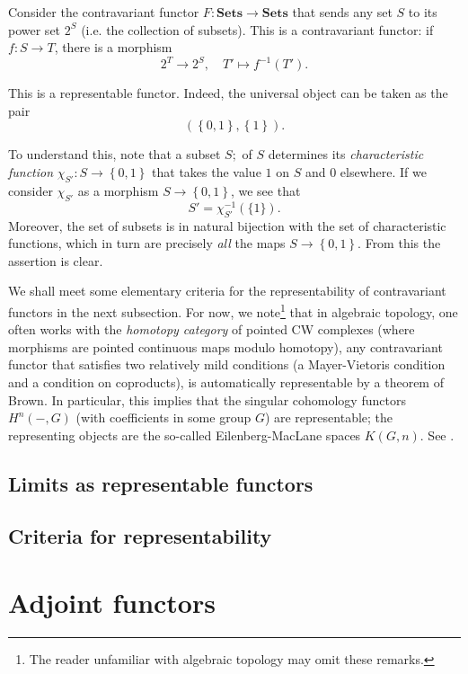 \begin{example}
Consider the contravariant functor $F: \mathbf{Sets} \to \mathbf{Sets}$ that
sends any set $S$ to its power set $2^S$ (i.e. the collection of subsets).
This is a contravariant functor: if $f: S \to T$, there is a morphism
\[ 2^T \to 2^S, \quad T' \mapsto f^{-1}(T').  \]

This is a representable functor. Indeed, the universal object can be taken as
the pair
\[ ( \left\{0,1\right\}, \left\{1\right\}).  \]

To understand this, note that a subset $S;$ of $S$ determines its
\emph{characteristic function} $\chi_{S'}: S \to \left\{0,1\right\}$ that
takes the value $1$ on $S$ and $0$ elsewhere.
If we consider $\chi_{S'}$ as a morphism $ S \to \left\{0,1\right\}$, we see
that
\[ S' = \chi_{S'}^{-1}(\{1\}).  \]
Moreover, the set of subsets is in natural bijection with the set of
characteristic functions, which in turn are precisely \emph{all} the maps $S
\to \left\{0,1\right\}$. From this the assertion is clear.
\end{example}

We shall meet some elementary criteria for the representability of
contravariant functors in the next subsection. For now, we note\footnote{The
reader unfamiliar with algebraic topology may omit these remarks.} that in
algebraic topology, one often works with the \emph{homotopy category} of
pointed CW complexes (where morphisms are pointed continuous maps modulo
homotopy), any contravariant functor that satisfies two relatively mild
conditions (a
Mayer-Vietoris condition and a condition on coproducts), is automatically
representable by a theorem of Brown. In particular, this implies that the
singular cohomology functors $H^n(-, G)$ (with coefficients in some group $G$)
are representable; the representing objects are the so-called
Eilenberg-MacLane spaces  $K(G,n)$.  See \cite{Ha02}.


\subsection{Limits as representable functors}

\add{}

\subsection{Criteria for representability}

\section{Adjoint functors}

